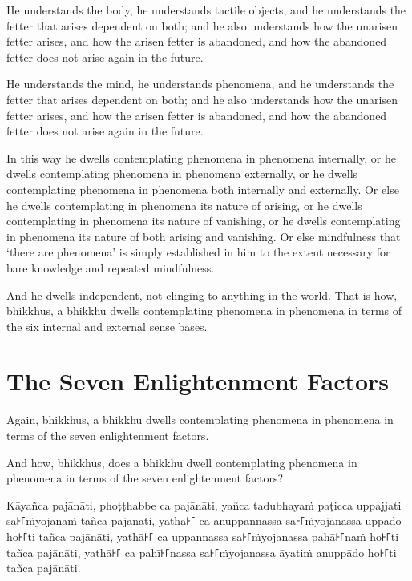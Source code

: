 \englishPage

He understands the body, he understands tactile objects, and he understands the
fetter that arises dependent on both; and he also understands how the unarisen
fetter arises, and how the arisen fetter is abandoned, and how the abandoned
fetter does not arise again in the future.

He understands the mind, he understands phenomena, and he understands the fetter
that arises dependent on both; and he also understands how the unarisen fetter
arises, and how the arisen fetter is abandoned, and how the abandoned fetter
does not arise again in the future.

In this way he dwells contemplating phenomena in phenomena internally, or he
dwells contemplating phenomena in phenomena externally, or he dwells
contemplating phenomena in phenomena both internally and externally. Or else he
dwells contemplating in phenomena its nature of arising, or he dwells
contemplating in phenomena its nature of vanishing, or he dwells contemplating
in phenomena its nature of both arising and vanishing. Or else mindfulness that
‘there are phenomena’ is simply established in him to the extent necessary for
bare knowledge and repeated mindfulness.

And he dwells independent, not clinging to anything in the world. That is how,
bhikkhus, a bhikkhu dwells contemplating phenomena in phenomena in terms of the
six internal and external sense bases.


\section{The Seven Enlightenment Factors}

Again, bhikkhus, a bhikkhu dwells contemplating phenomena in phenomena in terms
of the seven enlightenment factors.

And how, bhikkhus, does a bhikkhu dwell contemplating phenomena in phenomena in
terms of the seven enlightenment factors?

\paliPage

Kāyañca pajānāti,
phoṭṭhabbe ca pajānāti,
yañca tadubhayaṁ paṭicca uppajjati sa꜔꜒ṁyojanaṁ tañca pajānāti,
yathā꜔꜒ ca anuppannassa sa꜔꜒ṁyojanassa uppādo ho꜔꜒ti tañca pajānāti,
yathā꜔꜒ ca uppannassa sa꜔꜒ṁyojanassa pahā꜔꜒naṁ ho꜔꜒ti tañca pajānāti,
yathā꜔꜒ ca pahī꜔꜒nassa sa꜔꜒ṁyojanassa āyatiṁ anuppādo ho꜔꜒ti tañca pajānāti.


